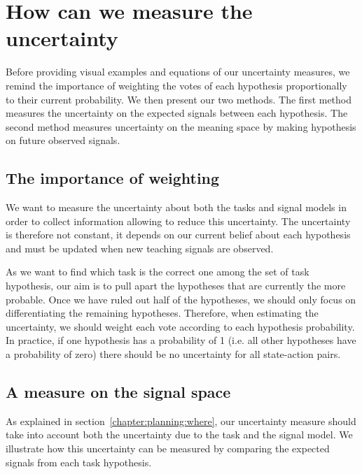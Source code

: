 \section{How can we measure the uncertainty}
\label{chapter:planning:how}

Before providing visual examples and equations of our uncertainty measures, we remind the importance of weighting the votes of each hypothesis proportionally to their current probability. We then present our two methods. The first method measures the uncertainty on the expected signals between each hypothesis. The second method measures uncertainty on the meaning space by making hypothesis on future observed signals.

\subsection{The importance of weighting}

We want to measure the uncertainty about both the tasks and signal models in order to collect information allowing to reduce this uncertainty. The uncertainty is therefore not constant, it depends on our current belief about each hypothesis and must be updated when new teaching signals are observed.

As we want to find which task is the correct one among the set of task hypothesis, our aim is to pull apart the hypotheses that are currently the more probable. Once we have ruled out half of the hypotheses, we should only focus on differentiating the remaining hypotheses. Therefore, when estimating the uncertainty, we should weight each vote according to each hypothesis probability. In practice, if one hypothesis has a probability of 1 (i.e. all other hypotheses have a probability of zero) there should be no uncertainty for all state-action pairs.

\subsection{A measure on the signal space}
\label{chapter:planning:uncertaintysignalspace}

As explained in section~\ref{chapter:planning:where}, our uncertainty measure should take into account both the uncertainty due to the task and the signal model. We illustrate how this uncertainty can be measured by comparing the expected signals from each task hypothesis.

